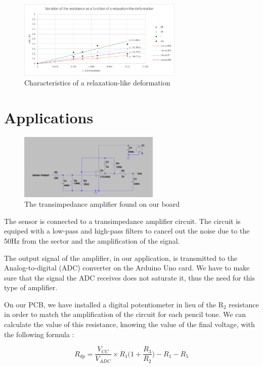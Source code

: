 \documentclass[10pt]{datasheet}
\begin{document}
\begin{figure}[h!]
	\centering
	\includegraphics[width=0.7\textwidth]{Cover/Bench-Relaxation.png}
    \captionsetup{justification=centering}
	\caption{\small{Characteristics of a relaxation-like deformation}}
\end{figure}

\newpage

\section{Applications}

\begin{figure}[h!]
	\centering
	\includegraphics[width=0.6\textwidth]{Cover/TransimpedanceAmp.png}
    \captionsetup{justification=centering}
	\caption{\small{The transimpedance amplifier found on our board}}
\end{figure}

The sensor is connected to a transimpedance amplifier circuit. The circuit is equiped with a 
low-pass and high-pass filters to cancel out the noise due to the 50Hz from the sector and the amplification 
of the signal. 

The output signal of the amplifier, in our application, is transmitted to the Analog-to-digital (ADC) converter on the Arduino Uno
card. We have to make sure that the signal the ADC receives does not saturate it, thus the need for this type of amplifier. 

On our PCB, we have installed a digital potentiometer in lieu of the $\text{R}_2$ resistance in order to match the amplification of the circuit
for each pencil tone. We can calculate the value of this resistance, knowing the value of the final voltage, with the following formula :

\begin{equation*}
    R_{dp} = \frac{V_{CC}}{V_{ADC}}\times R_1\Big(1 + \frac{R_3}{R_2}\Big) - R_1 - R_5
\end{equation*}
\end{document}
